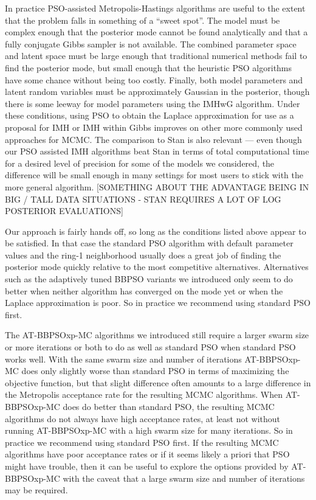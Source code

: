 \documentclass[12pt]{article}
\begin{document}
In practice PSO-assisted Metropolis-Hastings algorithms are useful to the extent that the problem falls in something of a ``sweet spot''. The model must be complex enough that the posterior mode cannot be found analytically and that a fully conjugate Gibbs sampler is not available. The combined parameter space and latent space must be large enough that traditional numerical methods fail to find the posterior mode, but small enough that the heuristic PSO algorithms have some chance without being too costly. Finally, both model parameters and latent random variables must be approximately Gaussian in the posterior, though there is some leeway for model parameters using the IMHwG algorithm. Under these conditions, using PSO to obtain the Laplace approximation for use as a proposal for IMH or IMH within Gibbs improves on other more commonly used approaches for MCMC. The comparison to Stan is also relevant --- even though our PSO assisted IMH algorithms beat Stan in terms of total computational time for a desired level of precision for some of the models we considered, the difference will be small enough in many settings for most users to stick with the more general algorithm. [SOMETHING ABOUT THE ADVANTAGE BEING IN BIG / TALL DATA SITUATIONS - STAN REQUIRES A LOT OF LOG POSTERIOR EVALUATIONS]

Our approach is fairly hands off, so long as the conditions listed above appear to be satisfied. In that case the standard PSO algorithm with default parameter values and the ring-1 neighborhood usually does a great job of finding the posterior mode quickly relative to the most competitive alternatives. Alternatives such as the adaptively tuned BBPSO variants we introduced only seem to do better when neither algorithm has converged on the mode yet or when the Laplace approximation is poor. So in practice we recommend using standard PSO first.


 The AT-BBPSOxp-MC algorithms we introduced still require a larger swarm size or more iterations or both to do as well as standard PSO when standard PSO works well. With the same swarm size and number of iterations AT-BBPSOxp-MC does only slightly worse than standard PSO in terms of maximizing the objective function, but that slight difference often amounts to a large difference in the Metropolis acceptance rate for the resulting MCMC algorithms. When AT-BBPSOxp-MC does do better than standard PSO, the resulting MCMC algorithms do not always have high acceptance rates, at least not without running AT-BBPSOxp-MC with a high swarm size for many iterations. So in practice we recommend using standard PSO first. If the resulting MCMC algorithms have poor acceptance rates or if it seems likely a priori that PSO might have trouble, then it can be useful to explore the options provided by AT-BBPSOxp-MC with the caveat that a large swarm size and number of iterations may be required.
 
\clearpage\pagebreak\newpage\thispagestyle{empty}


\end{document}
